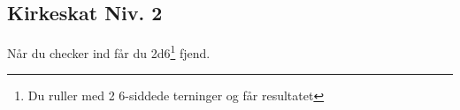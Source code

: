 \subsection*{Kirkeskat Niv. 2}
Når du checker ind får du 2d6\footnote{Du ruller med 2 6-siddede terninger og får resultatet} fjend.
